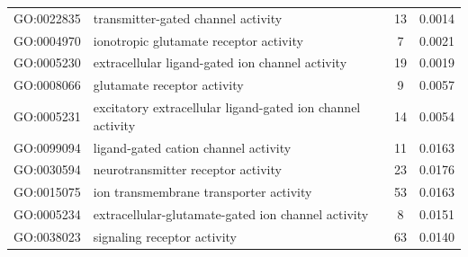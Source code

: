 \documentclass[10pt,letterpaper]{article}
\begin{document}
\begin{table}[]
\begin{tabular}{llcc}
GO:0022835                                 & transmitter-gated channel activity                         & 13                                                                                       & 0.0014                                \\
GO:0004970                                 & ionotropic glutamate receptor activity                     & 7                                                                                        & 0.0021                                \\
GO:0005230                                 & extracellular ligand-gated ion channel activity            & 19                                                                                       & 0.0019                                \\
GO:0008066                                 & glutamate receptor activity                                & 9                                                                                        & 0.0057                                \\
GO:0005231                                 & excitatory extracellular ligand-gated ion channel activity & 14                                                                                       & 0.0054                                \\
GO:0099094                                 & ligand-gated cation channel activity                       & 11                                                                                       & 0.0163                                \\
GO:0030594                                 & neurotransmitter receptor activity                         & 23                                                                                       & 0.0176                                \\
GO:0015075                                 & ion transmembrane transporter activity                     & 53                                                                                       & 0.0163                                \\
GO:0005234                                 & extracellular-glutamate-gated ion channel activity         & 8                                                                                        & 0.0151                                \\
GO:0038023                                 & signaling receptor activity                                & 63                                                                                       & 0.0140                                \\

\end{tabular}
\end{table}
\end{document}
